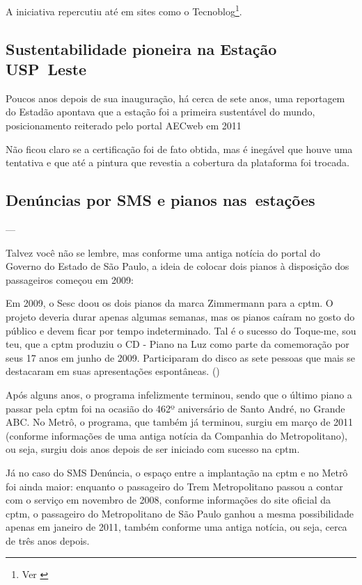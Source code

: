 \documentclass[11pt,fleqn]{book} %
\begin{document}
A iniciativa repercutiu até em sites como o Tecnoblog\footnote{Ver \cite{higa2017}}.

\subsection{Sustentabilidade pioneira na Estação USP Leste}

Poucos anos depois de sua inauguração, há cerca de sete anos, uma reportagem do Estadão apontava que a estação foi a primeira sustentável do mundo, posicionamento reiterado pelo portal AECweb em 2011


Não ficou claro se a certificação foi de fato obtida, mas é inegável que houve uma tentativa e que até a pintura que revestia a cobertura da plataforma foi trocada.

\subsection{Denúncias por SMS e pianos nas estações}

---

Talvez você não se lembre, mas conforme uma antiga notícia do portal do Governo do Estado de São Paulo, a ideia de colocar dois pianos à disposição dos passageiros começou em 2009:

\begin{citacao}
	Em 2009, o Sesc doou os dois pianos da marca Zimmermann para a \gls{cptm}. O projeto deveria durar apenas algumas semanas, mas os pianos caíram no gosto do público e devem ficar por tempo indeterminado. Tal é o sucesso do Toque-me, sou teu, que a \gls{cptm} produziu o CD - Piano na Luz como parte da comemoração por seus 17 anos em junho de 2009. Participaram do disco as sete pessoas que mais se destacaram em suas apresentações espontâneas. (\cite{gesp2010a})
\end{citacao}

Após alguns anos, o programa infelizmente terminou, sendo que o último piano a passar pela \gls{cptm} foi na ocasião do 462º aniversário de Santo André, no Grande ABC. No Metrô, o programa, que também já terminou, surgiu em março de 2011 (conforme informações de uma antiga notícia da Companhia do Metropolitano), ou seja, surgiu dois anos depois de ser iniciado com sucesso na \gls{cptm}.

Já no caso do SMS Denúncia, o espaço entre a implantação na \gls{cptm} e no Metrô foi ainda maior: enquanto o passageiro do Trem Metropolitano passou a contar com o serviço em novembro de 2008, conforme informações do site oficial da \gls{cptm}, o passageiro do Metropolitano de São Paulo ganhou a mesma possibilidade apenas em janeiro de 2011, também conforme uma antiga notícia, ou seja, cerca de três anos depois.
\end{document}
